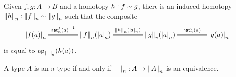 \documentclass[hott-all.tex]{subfiles}
\begin{document}
% 
% 
\begin{lem}
  Given $f,g:A\to B$ and a homotopy $h:f\htpy g$, there is an induced homotopy $\trunc n h : \trunc n f \htpy \trunc n g$ such that the composite
  \begin{equation}
    \xymatrix@C=3.6pc{\tproj n{f(a)} \ar@{=}[r]^-{\opp{\mathsf{nat}^f_n(a)}} &
      \trunc n f(\tproj n a) \ar@{=}[r]^-{\trunc n h(\tproj na)} &
      \trunc n g(\tproj n a) \ar@{=}[r]^-{\mathsf{nat}^g_n(a)} &
      \tproj n{g(a)}}\fakelabel{eq:trunc-htpy}
  \end{equation}
  is equal to $\apfunc{\tprojf n}(h(a))$.
\end{lem}
% 
% 
\begin{cor}
  A type $A$ is an $n$-type if and only if $\tprojf n : A \to \trunc n A$ is an equivalence.
\end{cor}
\end{document}
